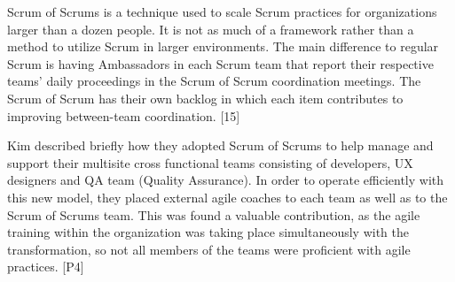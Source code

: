Scrum of Scrums is a technique used to scale Scrum practices for organizations
larger than a dozen people. It is not as much of a framework rather than a
method to utilize Scrum in larger environments. The main difference to regular
Scrum is having Ambassadors in each Scrum team that report their respective
teams' daily proceedings in the Scrum of Scrum coordination meetings. The Scrum
of Scrum has their own backlog in which each item contributes to improving
between-team coordination. [15]

Kim described briefly how they adopted Scrum of Scrums to help manage
and support their multisite cross functional teams consisting of
developers, UX designers and QA team (Quality Assurance). In order to operate
efficiently with this new model, they placed external agile coaches to each team
as well as to the Scrum of Scrums team. This was found a valuable contribution,
as the agile training within the organization was taking place simultaneously
with the transformation, so not all members of the teams were proficient with
agile practices. [P4]
